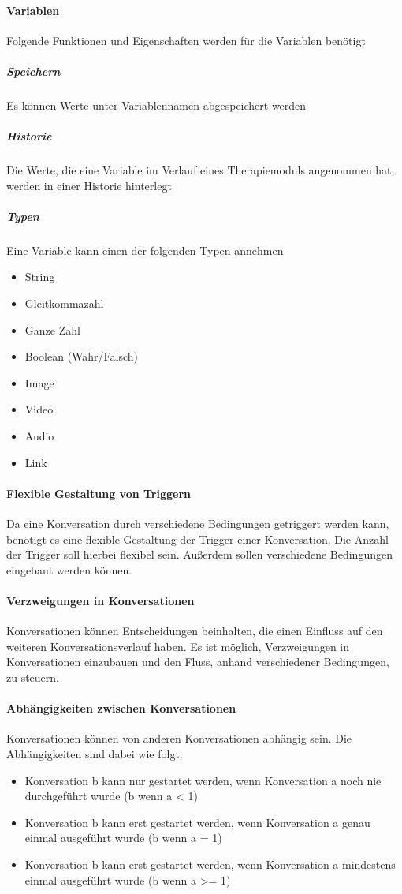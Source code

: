 \paragraph{Variablen} Folgende Funktionen und Eigenschaften werden für die Variablen benötigt
\subparagraph{Speichern}Es können Werte unter Variablennamen abgespeichert werden
\subparagraph{Historie}Die Werte, die eine Variable im Verlauf eines Therapiemoduls angenommen hat, werden in einer Historie hinterlegt
\subparagraph{Typen}Eine Variable kann einen der folgenden Typen annehmen
\begin{itemize}
\item String
\item Gleitkommazahl
\item Ganze Zahl 
\item Boolean (Wahr/Falsch)
\item Image 
\item Video
\item Audio
\item Link
\end{itemize}	

\paragraph{Flexible Gestaltung von Triggern}
Da eine Konversation durch verschiedene Bedingungen getriggert werden kann, benötigt es eine flexible Gestaltung der Trigger einer Konversation. Die Anzahl der Trigger soll hierbei flexibel sein. Außerdem sollen verschiedene Bedingungen eingebaut werden können.

\paragraph{Verzweigungen in Konversationen}
Konversationen können Entscheidungen beinhalten, die einen Einfluss auf den weiteren Konversationsverlauf haben. Es ist möglich, Verzweigungen in Konversationen einzubauen und den Fluss, anhand verschiedener Bedingungen, zu steuern. 

\paragraph{Abhängigkeiten zwischen Konversationen}
Konversationen können von anderen Konversationen abhängig sein. Die Abhängigkeiten sind dabei wie folgt:
\begin{itemize}
\item Konversation b kann nur gestartet werden, wenn Konversation a noch nie durchgeführt wurde (b wenn a < 1)
\item Konversation b kann erst gestartet werden, wenn Konversation a genau einmal ausgeführt wurde (b wenn a = 1)
\item Konversation b kann erst gestartet werden, wenn Konversation a mindestens einmal ausgeführt wurde (b wenn a >= 1)  
\end{itemize} 

